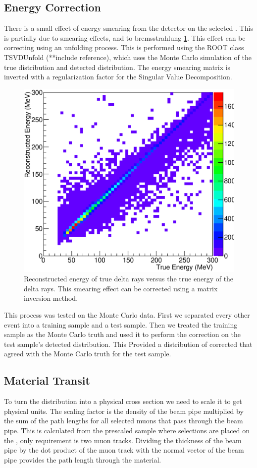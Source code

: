 \subsection{Energy Correction}
	There is a small effect of energy smearing from the detector on the selected \deltarays. This is partially due to smearing effects, and to bremsstrahlung \ref{BPsmear}. This effect can be correcting using an unfolding  process. This is performed using the ROOT class TSVDUnfold (**include reference), which uses the Monte Carlo simulation of the true distribution and detected distribution. The energy smearing matrix is inverted with a regularization factor for the Singular Value Decomposition. 
	\begin{figure}[!htp]
		\label{BPsmear}
		\centering
		\includegraphics[scale=0.5]{figures/Energy_Smearing.eps}
		\caption{Reconstructed energy of true delta rays versus the true energy of the delta rays. This smearing effect can be corrected using a matrix inversion method.}
	\end{figure}

	This process was tested on the Monte Carlo data. First we separated every other event into a training sample and a test sample. Then we treated the training sample as the Monte Carlo truth and used it to perform the correction on the test sample’s detected distribution. This Provided a distribution of corrected \deltarays that agreed with the Monte Carlo truth for the test sample.

\subsection{Material Transit}
	To turn the \deltaray distribution into a physical cross section we need to scale it to get physical units. The scaling factor is the density of the beam pipe multiplied by the sum of the path lengths for all selected muons that pass through the beam pipe. This is calculated from the prescaled sample where selections are placed on the \deltarays, only requirement is two muon tracks. Dividing the thickness of the beam pipe by the dot product of the muon track with the normal vector of the beam pipe provides the path length through the material.
